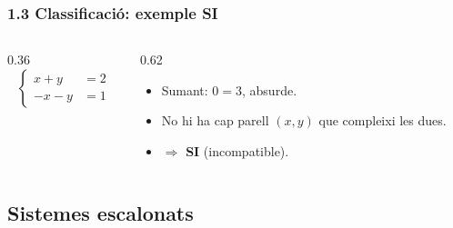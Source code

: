 \documentclass[aspectratio=169]{beamer}
\newcommand{\textverd}[1]{{\color{margueVerdFosc}#1}}
\begin{document}
\begin{frame}[t]
  \frametitle{1.3 Classificació: exemple SI}

  \vspace{-0.25cm}
  \begin{columns}[T,onlytextwidth]
    \begin{column}{0.36\textwidth}
      \[
        \left\{\begin{aligned}
          x + y &= 2 \\
          -x - y &= 1
        \end{aligned}\right.
      \]
    \end{column}

    \begin{column}{0.62\textwidth}
      \begin{itemize}
        \item<1-> Sumant: $0=3$, absurde.
        \item<2-> No hi ha cap parell $(x,y)$ que compleixi les dues.
        \item<3-> \;$\Rightarrow$\; \textverd{\textbf{SI}} (incompatible).
      \end{itemize}
    \end{column}
  \end{columns}

  \vspace{0.15cm}
\end{frame}

\subsection{Sistemes escalonats}
\end{document}
